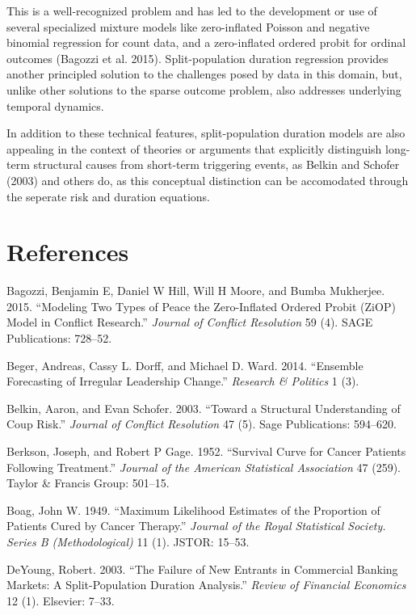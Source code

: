 \documentclass[article]{jss}
\begin{document}
This is a well-recognized problem and has led to the development or use
of several specialized mixture models like zero-inflated Poisson and
negative binomial regression for count data, and a zero-inflated ordered
probit for ordinal outcomes (Bagozzi et al. 2015). Split-population
duration regression provides another principled solution to the
challenges posed by data in this domain, but, unlike other solutions to
the sparse outcome problem, also addresses underlying temporal dynamics.

In addition to these technical features, split-population duration
models are also appealing in the context of theories or arguments that
explicitly distinguish long-term structural causes from short-term
triggering events, as Belkin and Schofer (2003) and others do, as this
conceptual distinction can be accomodated through the seperate risk and
duration equations.

\section*{References}\label{references}

Bagozzi, Benjamin E, Daniel W Hill, Will H Moore, and Bumba Mukherjee.
2015. ``Modeling Two Types of Peace the Zero-Inflated Ordered Probit
(ZiOP) Model in Conflict Research.'' \emph{Journal of Conflict
Resolution} 59 (4). SAGE Publications: 728--52.

Beger, Andreas, Cassy L. Dorff, and Michael D. Ward. 2014. ``Ensemble
Forecasting of Irregular Leadership Change.'' \emph{Research \&
Politics} 1 (3).

Belkin, Aaron, and Evan Schofer. 2003. ``Toward a Structural
Understanding of Coup Risk.'' \emph{Journal of Conflict Resolution} 47
(5). Sage Publications: 594--620.

Berkson, Joseph, and Robert P Gage. 1952. ``Survival Curve for Cancer
Patients Following Treatment.'' \emph{Journal of the American
Statistical Association} 47 (259). Taylor \& Francis Group: 501--15.

Boag, John W. 1949. ``Maximum Likelihood Estimates of the Proportion of
Patients Cured by Cancer Therapy.'' \emph{Journal of the Royal
Statistical Society. Series B (Methodological)} 11 (1). JSTOR: 15--53.

DeYoung, Robert. 2003. ``The Failure of New Entrants in Commercial
Banking Markets: A Split-Population Duration Analysis.'' \emph{Review of
Financial Economics} 12 (1). Elsevier: 7--33.
\end{document}
